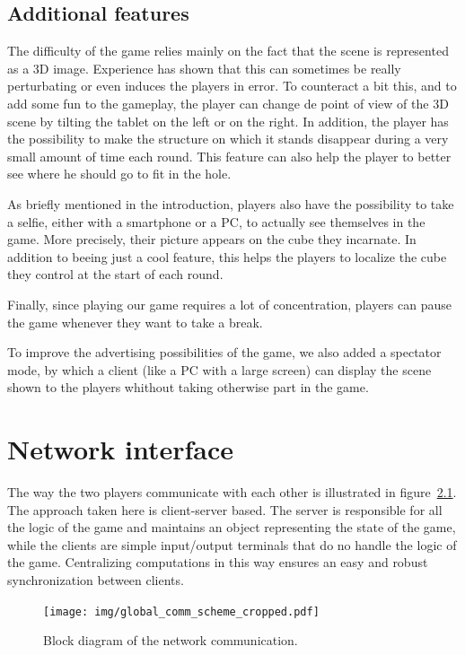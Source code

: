 \documentclass[english, DIV=13]{scrreprt}
\begin{document}
\section{Additional features}
The difficulty of the game relies mainly on the fact that the scene is represented as a
3D image. Experience has shown that this can sometimes be really perturbating or even
induces the players in error. To counteract a bit this, and to add some fun to the
gameplay, the player can change de point of view of the 3D scene by tilting the tablet
on the left or on the right. In addition, the player has the possibility to make the
structure on which it stands disappear during a very small amount of time each round.
This feature can also help the player to better see where he should go to fit in the hole.

As briefly mentioned in the introduction, players also have the possibility to take a
selfie, either with a smartphone or a PC, to actually see themselves in the game. More
precisely, their picture appears on the cube they incarnate. In addition to beeing just a
cool feature, this helps the players to localize the cube they control at the start of
each round.

Finally, since playing our game requires a lot of concentration, players can pause the
game whenever they want to take a break.

To improve the advertising possibilities of the game, we also added a spectator mode,
by which a client (like a PC with a large screen) can display the scene shown to the
players whithout taking otherwise part in the game.

\chapter{Network interface}
\label{chap:net-interface}

The way the two players communicate with each other is illustrated in
figure~\ref{fig:comm-scheme}.
The approach taken here is client-server based. The server is responsible
for all the logic of the game and maintains an object representing the state of the game,
while the clients are simple input/output terminals that do no handle the logic of the
game. Centralizing computations in this way ensures an easy and robust synchronization
between clients.

\begin{figure}[hbt]
    \centering
    \texttt{[image: img/global\_comm\_scheme\_cropped.pdf]}
    \caption{Block diagram of the network communication.}
    \label{fig:comm-scheme}
\end{figure}
\end{document}
